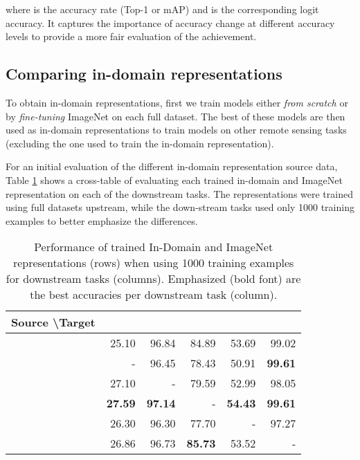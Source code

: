 where  is the accuracy rate (Top-1 or mAP) and  is the corresponding logit accuracy. It captures the importance of accuracy change at different accuracy levels to provide a more fair evaluation of the achievement.







\subsection{Comparing in-domain representations}
\label{training-in-domain-repr}
To obtain in-domain representations, first we train models either \emph{from scratch} or by \emph{fine-tuning} ImageNet on each full dataset. The best of these models are then used as in-domain representations to train models on other remote sensing tasks (excluding the one used to train the in-domain representation).

For an initial evaluation of the different in-domain representation source data, Table \cref{tab:cross-in-domain} shows a cross-table of evaluating each trained in-domain and ImageNet representation on each of the downstream tasks. The representations were trained using full datasets upstream, while the down-stream tasks used only 1000 training examples to better emphasize the differences.














\begin{table}[tb]
    \caption{Performance of trained In-Domain and ImageNet representations (rows) when using 1000 training examples for downstream tasks (columns). Emphasized (bold font) are the best accuracies per downstream task (column).}
    \label{tab:cross-in-domain}
    \centering

\begin{tabular}{lrrrrr}
\toprule
Source \textbackslash Target & \bigearthnet{} &    \eurosat{} &   \resisc{} &     \sosat{} &  \ucmerced{} \\
\midrule
\imagenet{}    &       25.10 &      96.84 &      84.89 &      53.69 &      99.02 \\
\bigearthnet{} &           - &      96.45 &      78.43 &      50.91 &  \bf 99.61 \\
\eurosat{}     &       27.10 &          - &      79.59 &      52.99 &      98.05 \\
\resisc{}    &   \bf 27.59 &  \bf 97.14 &          - &  \bf 54.43 &  \bf 99.61 \\
\sosat{}      &       26.30 &      96.30 &      77.70 &          - &      97.27 \\
\ucmerced{}   &       26.86 &      96.73 &  \bf 85.73 &      53.52 &          - \\
\bottomrule
\end{tabular}


\end{table}

